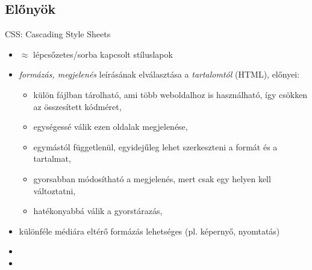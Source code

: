 \subsection{Előnyök}

\begin{frame}
  CSS: Cascading Style Sheets
  \begin{itemize}
    \item $\approx$ lépcsőzetes/sorba kapcsolt stíluslapok
    \item \emph{formázás, megjelenés} leírásának elválasztása a \emph{tartalomtól} (HTML), előnyei:
    \begin{itemize}
      \item külön fájlban tárolható, ami több weboldalhoz is használható, így csökken az összesített kódméret, 
      \item egységessé válik ezen oldalak megjelenése,
      \item egymástól függetlenül, egyidejűleg lehet szerkeszteni a formát és a tartalmat,
      \item gyorsabban módosítható a megjelenés, mert csak egy helyen kell változtatni,
      \item hatékonyabbá válik a gyorstárazás,
    \end{itemize}
    \item különféle médiára eltérő formázás lehetséges (pl. képernyő, nyomtatás)
    \item {}
    \item {}
  \end{itemize}
\end{frame}
